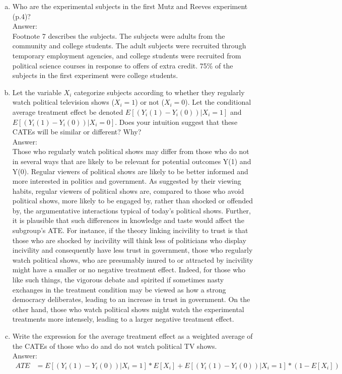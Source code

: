 \documentclass[11pt,notitlepage]{article}\usepackage[]{graphicx}\usepackage[]{color}
\begin{document}
\begin{enumerate}[a)]
\item Who are the experimental subjects in the first Mutz and Reeves experiment (p.4)?\\
Answer:\\
Footnote 7 describes the subjects. The subjects were adults from the community and college students. The adult subjects were recruited through temporary employment agencies, and college students were recruited from political science courses in response to offers of extra credit. 75\% of the subjects in the first experiment were college students. 

\item Let the variable $X_i$ categorize subjects according to whether they regularly watch political television shows ($X_i = 1$) or not ($X_i = 0$). Let the conditional average treatment effect be denoted $E[(Y_i(1) - Y_i(0))|X_i=1]$ and $E[(Y_i(1) - Y_i(0))|X_i=0]$. Does your intuition suggest that these CATEs will be similar or different? Why?\\
Answer:\\
Those who regularly watch political shows may differ from those who do not in several ways that are likely to be relevant for potential outcomes Y(1) and Y(0). Regular viewers of political shows are likely to be better informed and more interested in politics and government. As suggested by their viewing habits, regular viewers of political shows are, compared to those who avoid political shows, more likely to be engaged by, rather than shocked or offended by, the argumentative interactions typical of today's political shows. Further, it is plausible that such differences in knowledge and taste would affect the subgroup's ATE. For instance, if the theory linking incivility to trust is that those who are shocked by incivility will think less of politicians who display incivility and consequently have less trust in government, those who regularly watch political shows, who are presumably inured to or attracted by incivility might have a smaller or no negative treatment effect. Indeed, for those who like such things, the vigorous debate and spirited if sometimes nasty exchanges in the treatment condition may be viewed as how a strong democracy deliberates, leading to an increase in trust in government. On the other hand, those who watch political shows might watch the experimental treatments more intensely, leading to a larger negative treatment effect. 

\item Write the expression for the average treatment effect as a weighted average of the CATEs of those who do and do not watch political TV shows.\\
Answer:\\
\begin{align*}
ATE &= E[(Y_i(1) - Y_i(0))| X_i=1] * E[X_i] + E[(Y_i(1) - Y_i(0))| X_i=1]*(1-E[X_i])
\end{align*}


\end{enumerate}
\end{document}

